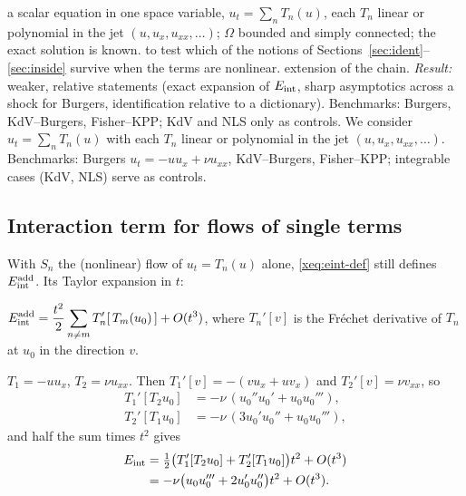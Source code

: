 \sectionbrief
{a scalar equation in one space variable, $u_t=\sum_nT_n(u)$, each $T_n$ linear or polynomial in the jet $(u,u_x,u_{xx},\dots)$; $\Omega$ bounded and simply connected; the exact solution is known.}
{to test which of the notions of Sections~\ref{sec:ident}--\ref{sec:inside} survive when the terms are nonlinear.}
{extension of the chain. \emph{Result:} weaker, relative statements (exact expansion of $E_{\mathrm{int}}$, sharp asymptotics across a shock for Burgers, identification relative to a dictionary). Benchmarks: Burgers, KdV--Burgers, Fisher--KPP; KdV and NLS only as controls.}
We consider $u_t=\sum_nT_n(u)$ with each $T_n$ linear or polynomial in the jet $(u,u_x,u_{xx},\dots)$. Benchmarks: Burgers $u_t=-uu_x+\nu u_{xx}$, KdV--Burgers, Fisher--KPP; integrable cases (KdV, NLS) serve as controls.

\subsection{Interaction term for flows of single terms}
With $S_n$ the (nonlinear) flow of $u_t=T_n(u)$ alone, \eqref{xeq:eint-def} still defines $E_{\mathrm{int}}^{\mathrm{add}}$. Its Taylor expansion in $t$:
\begin{theorem}\label{thm:jet}
$\displaystyle E_{\mathrm{int}}^{\mathrm{add}}=\frac{t^2}{2}\sum_{n\ne m}T_n'[\,T_m(u_0)\,]+O(t^3)$, where $T_n'[v]$ is the Fr\'echet derivative of $T_n$ at $u_0$ in the direction $v$.
\end{theorem}
\begin{example}[Burgers]\label{ex:burgers-jet}
$T_1=-uu_x$, $T_2=\nu u_{xx}$. Then $T_1'[v]=-(vu_x+uv_x)$ and $T_2'[v]=\nu v_{xx}$, so
\[
\begin{aligned}
T_1'[T_2u_0]&=-\nu\,(u_0''u_0'+u_0u_0'''),\\
T_2'[T_1u_0]&=-\nu\,(3u_0'u_0''+u_0u_0'''),
\end{aligned}
\]
and half the sum times $t^2$ gives
\[
\begin{aligned}
E_{\mathrm{int}}&=\tfrac12\big(T_1'[T_2u_0]+T_2'[T_1u_0]\big)t^2+O(t^3)\\
&=-\nu\big(u_0u_0'''+2u_0'u_0''\big)t^2+O(t^3).
\end{aligned}
\]
\end{example}

